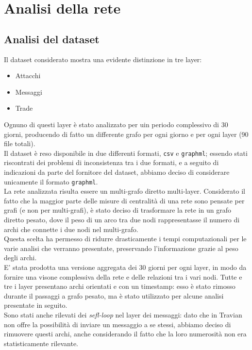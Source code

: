 \chapter{Analisi della rete}
\section{Analisi del dataset}
Il dataset considerato mostra una evidente distinzione in tre layer:
\begin{itemize}
	\item Attacchi
	\item Messaggi
	\item Trade
\end{itemize}
Ognuno di questi layer è stato analizzato per uin periodo complessivo di 30 giorni, producendo di fatto un differente grafo per ogni giorno e per ogni layer (90 file totali).\\
Il dataset è reso disponibile in due differenti formati, \texttt{csv} e \texttt{graphml}; essendo stati riscontrati dei problemi di inconsistenza tra i due formati, e a seguito di indicazioni da parte del fornitore del dataset, abbiamo deciso di considerare unicamente il formato \texttt{graphml}.\\
La rete analizzata risulta essere un multi-grafo diretto multi-layer. Considerato il fatto che la maggior parte delle misure di centralità di una rete sono pensate per grafi (e non per multi-grafi), è stato deciso di trasformare la rete in un grafo diretto pesato, dove il peso di un arco tra due nodi rappresentasse il numero di archi che connette i due nodi nel multi-grafo.\\
Questa scelta ha permesso di ridurre drasticamente i tempi computazionali per le varie analisi che verranno presentate, preservando l'informazione grazie al peso degli archi.\\
E' stata prodotta una versione aggregata dei 30 giorni per ogni layer, in modo da fornire una visone complessiva della rete e delle relazioni tra i vari nodi.
Tutte e tre i layer presentano archi orientati e con un timestamp: esso è stato rimosso durante il passaggi a grafo pesato, ma è stato utilizzato per alcune analisi presentate in seguito.\\
Sono stati anche rilevati dei \textit{sefl-loop} nel layer dei messaggi: dato che in Travian non offre la possibilità di inviare un messaggio a se stessi, abbiamo deciso di rimuovere questi archi, anche considerando il fatto che la loro numerosità non era statisticamente rilevante.

